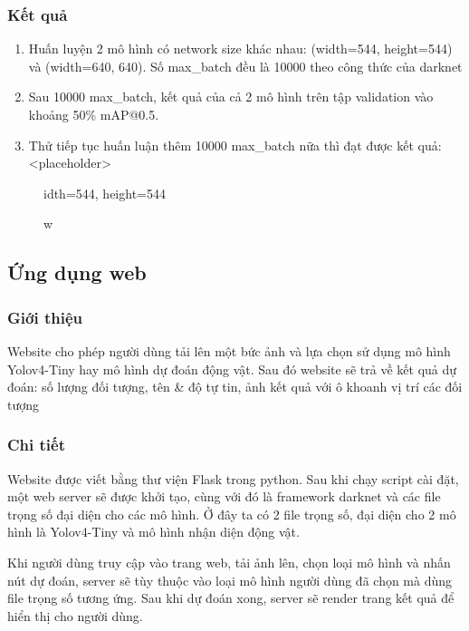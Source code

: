 \documentclass[20pt, a4paper]{article}
\begin{document}
\subsubsection{Kết quả}
\begin{enumerate}
	\item Huấn luyện 2 mô hình có network size khác nhau: (width=544, height=544) và (width=640, 640). Số max\_batch đều là 10000 theo công thức của darknet
	\item Sau 10000 max\_batch, kết quả của cả 2 mô hình trên tập validation vào khoảng 50\% mAP@0.5. 
	\item Thử tiếp tục huấn luận thêm 10000 max\_batch nữa thì đạt được kết quả: <placeholder>
\end{enumerate}

\begin{figure}[t]
	\centering
	\qquad
	\caption width=544, height=544
\end{figure}

\subsection{Ứng dụng web}
\subsubsection{Giới thiệu}
Website cho phép người dùng tải lên một bức ảnh và lựa chọn sử dụng mô hình Yolov4-Tiny hay mô hình dự đoán động vật. 
Sau đó website sẽ trả về kết quả dự đoán: số lượng đối tượng, tên \& độ tự tin, ảnh kết quả với ô khoanh vị trí các đối tượng

\subsubsection{Chi tiết}
Website được viết bằng thư viện Flask trong python. Sau khi chạy script cài đặt, một web server sẽ được khởi tạo, cùng với đó là framework darknet và các file trọng số đại diện cho các mô hình. 
Ở đây ta có 2 file trọng số, đại diện cho 2 mô hình là Yolov4-Tiny và mô hình nhận diện động vật.

Khi người dùng truy cập vào trang web, tải ảnh lên, chọn loại mô hình và nhấn nút dự đoán, 
server sẽ tùy thuộc vào loại mô hình người dùng đã chọn mà dùng file trọng số tương ứng. Sau khi dự đoán xong, server sẽ render trang kết quả để hiển thị cho người dùng. 
	
\end{document}
